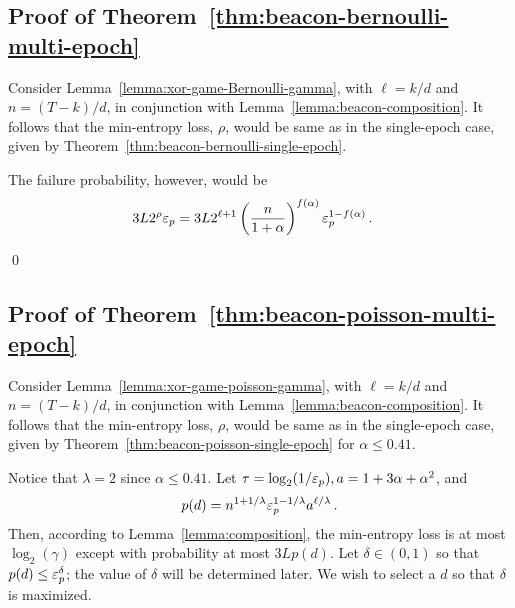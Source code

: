 \subsection*{Proof of Theorem~\ref{thm:beacon-bernoulli-multi-epoch}}
  Consider Lemma~\ref{lemma:xor-game-Bernoulli-gamma}, 
  with $\ell = k/d$ and $n = (T-k)/d$, 
  in conjunction with Lemma~\ref{lemma:beacon-composition}.
  It follows that the min-entropy loss, $\rho$, 
  would be same as in the single-epoch case, 
  given by Theorem~\ref{thm:beacon-bernoulli-single-epoch}.

  The failure probability, however, would be 
  \begin{align*}
    3 L 2^\rho \mathsf{\varepsilon}_p
    &= 3 L 2^{\ell + 1} 
      \left(\frac{n}{1+\alpha}\right)^{f(\alpha)} 
      \mathsf{\varepsilon}_p^{1 - f(\alpha)}
      \,.
  \end{align*}
  
\hfill\qed


\subsection*{Proof of Theorem~\ref{thm:beacon-poisson-multi-epoch}}
  Consider Lemma~\ref{lemma:xor-game-poisson-gamma}, 
  with $\ell = k/d$ and $n = (T-k)/d$, 
  in conjunction with Lemma~\ref{lemma:beacon-composition}.
  It follows that the min-entropy loss, $\rho$, 
  would be same as in the single-epoch case, 
  given by Theorem~\ref{thm:beacon-poisson-single-epoch} 
  for $\alpha \leq 0.41$.









  Notice that $\lambda = 2$ since $\alpha \leq 0.41$.
  Let $\tau = \log_2(1/\mathsf{\varepsilon}_p), a = 1 + 3 \alpha + \alpha^2$,
  and 
  $$
    p(d) = n^{1+1/\lambda} \mathsf{\varepsilon}_p^{1 - 1/\lambda} a^{\ell/\lambda}
    \,.
  $$
  Then, according to Lemma~\ref{lemma:composition}, 
  the min-entropy loss is at most $\log_2(\gamma)$ 
  except with probability at most $3 L p(d)$. 
  Let $\delta \in (0, 1)$ so that $p(d) \leq \mathsf{\varepsilon}_p^\delta$; 
  the value of $\delta$ will be determined later. 
  We wish to select a $d$ so that $\delta$ is maximized.

